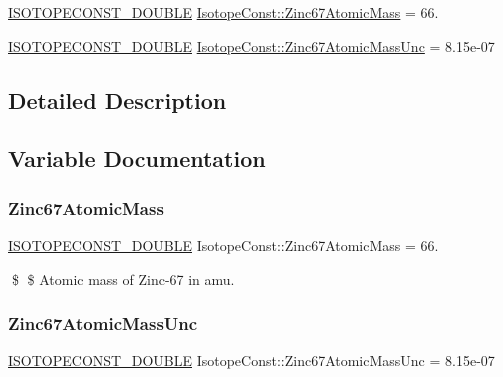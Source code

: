 \begin{DoxyCompactItemize}
\item 
\mbox{\hyperlink{group___isotope_const-_macros_ga8f45a7272ce02c0b4c65c44636ed719a}{I\+S\+O\+T\+O\+P\+E\+C\+O\+N\+S\+T\+\_\+\+D\+O\+U\+B\+LE}} \mbox{\hyperlink{group___isotope_const-_zinc-_zn67_ga989b2e2e45ac6b954e7f6236413cee07}{Isotope\+Const\+::\+Zinc67\+Atomic\+Mass}} = 66.
\item 
\mbox{\hyperlink{group___isotope_const-_macros_ga8f45a7272ce02c0b4c65c44636ed719a}{I\+S\+O\+T\+O\+P\+E\+C\+O\+N\+S\+T\+\_\+\+D\+O\+U\+B\+LE}} \mbox{\hyperlink{group___isotope_const-_zinc-_zn67_ga34623b93c1307629d45597f96e693b49}{Isotope\+Const\+::\+Zinc67\+Atomic\+Mass\+Unc}} = 8.\+15e-\/07
\end{DoxyCompactItemize}


\subsection{Detailed Description}


\subsection{Variable Documentation}
\mbox{\label{group___isotope_const-_zinc-_zn67_ga989b2e2e45ac6b954e7f6236413cee07}} 
\subsubsection{\texorpdfstring{Zinc67\+Atomic\+Mass}{Zinc67AtomicMass}}
{\footnotesize\ttfamily \mbox{\hyperlink{group___isotope_const-_macros_ga8f45a7272ce02c0b4c65c44636ed719a}{I\+S\+O\+T\+O\+P\+E\+C\+O\+N\+S\+T\+\_\+\+D\+O\+U\+B\+LE}} Isotope\+Const\+::\+Zinc67\+Atomic\+Mass = 66.}

\$ \$ Atomic mass of Zinc-\/67 in amu. \mbox{\label{group___isotope_const-_zinc-_zn67_ga34623b93c1307629d45597f96e693b49}} 
\subsubsection{\texorpdfstring{Zinc67\+Atomic\+Mass\+Unc}{Zinc67AtomicMassUnc}}
{\footnotesize\ttfamily \mbox{\hyperlink{group___isotope_const-_macros_ga8f45a7272ce02c0b4c65c44636ed719a}{I\+S\+O\+T\+O\+P\+E\+C\+O\+N\+S\+T\+\_\+\+D\+O\+U\+B\+LE}} Isotope\+Const\+::\+Zinc67\+Atomic\+Mass\+Unc = 8.\+15e-\/07}

